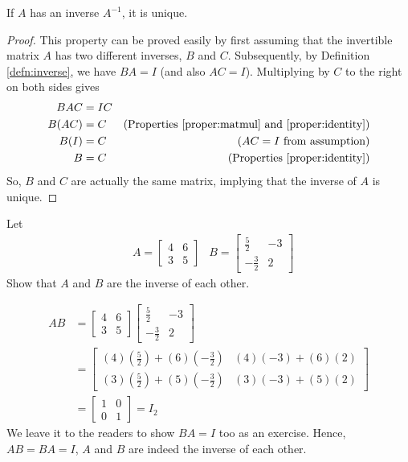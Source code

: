 \begin{proper}
\label{proper:uniqueinverse}
If $A$ has an inverse $A^{-1}$, it is unique.
\end{proper}
\begin{proof}
This property can be proved easily by first assuming that the invertible matrix $A$ has two different inverses, $B$ and $C$. Subsequently, by Definition \ref{defn:inverse}, we have $BA = I$ (and also $AC = I$). Multiplying by $C$ to the right on both sides gives
\begin{align*}
BAC &= IC \\
B(AC) &= C & \text{(Properties \ref{proper:matmul} and \ref{proper:identity})}\\
B(I) &= C & \text{($AC = I$ from assumption)} \\
B &= C & \text{(Properties \ref{proper:identity})}
\end{align*}
So, $B$ and $C$ are actually the same matrix, implying that the inverse of $A$ is unique.    
\end{proof}
\begin{exmp}
Let 
\begin{align*}
& A =
\begin{bmatrix}
4 & 6 \\
3 & 5
\end{bmatrix}
& B =
\begin{bmatrix}
\frac{5}{2} & -3 \\
-\frac{3}{2} & 2
\end{bmatrix}
\end{align*}
Show that $A$ and $B$ are the inverse of each other.
\end{exmp}
\begin{solution}
\begin{align*}
AB &= 
\begin{bmatrix}
4 & 6 \\
3 & 5
\end{bmatrix}
\begin{bmatrix}
\frac{5}{2} & -3 \\
-\frac{3}{2} & 2
\end{bmatrix} \\
&= 
\begin{bmatrix}
(4)(\frac{5}{2})+(6)(-\frac{3}{2}) & (4)(-3)+(6)(2) \\
(3)(\frac{5}{2})+(5)(-\frac{3}{2}) & (3)(-3)+(5)(2)
\end{bmatrix} \\
&= 
\begin{bmatrix}
1 & 0 \\
0 & 1
\end{bmatrix} = I_2
\end{align*}
We leave it to the readers to show $BA = I$ too as an exercise. Hence, $AB = BA = I$, $A$ and $B$ are indeed the inverse of each other.
\end{solution}

